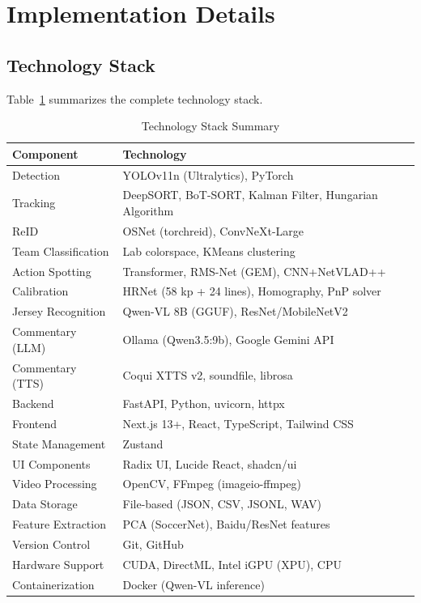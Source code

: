 \documentclass[10pt,twocolumn,a4paper]{article}
\begin{document}
\section{Implementation Details}

\subsection{Technology Stack}

Table~\ref{tab:techstack} summarizes the complete technology stack.

\begin{table}[H]
\centering
\caption{Technology Stack Summary}
\label{tab:techstack}
\scriptsize
\begin{tabularx}{\columnwidth}{lX}
\toprule
\textbf{Component} & \textbf{Technology} \\
\midrule
Detection & YOLOv11n (Ultralytics), PyTorch \\
Tracking & DeepSORT, BoT-SORT, Kalman Filter, Hungarian Algorithm \\
ReID & OSNet (torchreid), ConvNeXt-Large \\
Team Classification & Lab colorspace, KMeans clustering \\
Action Spotting & Transformer, RMS-Net (GEM), CNN+NetVLAD++ \\
Calibration & HRNet (58 kp + 24 lines), Homography, PnP solver \\
Jersey Recognition & Qwen-VL 8B (GGUF), ResNet/MobileNetV2 \\
Commentary (LLM) & Ollama (Qwen3.5:9b), Google Gemini API \\
Commentary (TTS) & Coqui XTTS v2, soundfile, librosa \\
Backend & FastAPI, Python, uvicorn, httpx \\
Frontend & Next.js 13+, React, TypeScript, Tailwind CSS \\
State Management & Zustand \\
UI Components & Radix UI, Lucide React, shadcn/ui \\
Video Processing & OpenCV, FFmpeg (imageio-ffmpeg) \\
Data Storage & File-based (JSON, CSV, JSONL, WAV) \\
Feature Extraction & PCA (SoccerNet), Baidu/ResNet features \\
Version Control & Git, GitHub \\
Hardware Support & CUDA, DirectML, Intel iGPU (XPU), CPU \\
Containerization & Docker (Qwen-VL inference) \\
\bottomrule
\end{tabularx}
\end{table}
\end{document}
